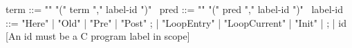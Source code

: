 \begin{syntax}
  term ::= "\at" "(" term "," label-id ")"
  \ 
  pred ::= "\at" "(" pred "," label-id ")" 
  \
  label-id ::= "Here" | "Old" | "Pre" | "Post" ;
             | "LoopEntry" | "LoopCurrent" | "Init" | ;
             | id [An id must be a C program label in scope]
\end{syntax}

